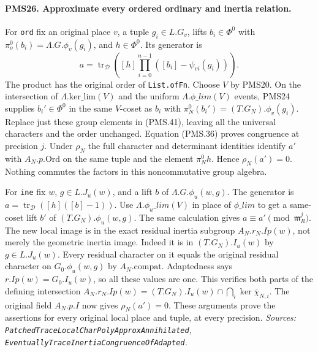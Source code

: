 \paragraph{PMS26. Approximate every ordered ordinary and inertia relation.}
\label{claim:PMS26}
For \texttt{ord} fix an original place $v$, a tuple
$g_i\in L.G_v$, lifts $b_i\in\Phi^0$ with
$\pi_o^0(b_i)=\Lambda.G.\phi_v(g_i)$, and $h\in\Phi^0$.
Its generator is
\[
 a=\operatorname{tr}_{\mathcal D}
 \left([h]\prod_{i=0}^{n-1}
             ([b_i]-\psi_{vi}(g_i))\right).       \tag{PMS.41}
\]
The product has the original order of \texttt{List.ofFn}.
Choose $V$ by PMS20.  On the intersection of
$\Lambda.\mathrm{ker\_lim}(V)$ and the uniform
$\Lambda.\phi\_lim(V)$ events, PMS24 supplies
$b_i'\in\Phi^0$ in the same $V$-coset as $b_i$ with
$\pi_N^0(b_i')=(T.G_N).\phi_v(g_i)$.
Replace just these group elements in (PMS.41), leaving all
the universal characters and the order unchanged.
Equation (PMS.36) proves congruence at precision $j$.
Under $\rho_N$ the full character and determinant identities
identify $a'$ with $A_N.p.\mathrm{Ord}$ on the same tuple and
the element $\pi_N^0h$.  Hence $\rho_N(a')=0$.
Nothing commutes the factors in this noncommutative group algebra.

For \texttt{ine} fix $w$, $g\in L.J_u(w)$, and a lift $b$
of $\Lambda.G.\phi_u(w,g)$.  The generator is
$a=\operatorname{tr}_{\mathcal D}([h]([b]-1))$.
Use $\Lambda.\phi_u\_lim(V)$ in place of $\phi\_lim$ to get
a same-coset lift $b'$ of $(T.G_N).\phi_u(w,g)$.
The same calculation gives $a\equiv a'\pmod{\mathfrak m_R^j}$.
The new local image is in the exact residual inertia subgroup
$A_N.r_N.Ip(w)$, not merely the geometric inertia image.
Indeed it is in $(T.G_N).I_u(w)$ by $g\in L.J_u(w)$.
Every residual character on it equals the original residual
character on $G_0.\phi_u(w,g)$ by $A_N.\mathrm{compat}$.
Adaptedness says $r.Ip(w)=G_0.I_u(w)$, so all these values
are one.  This verifies both parts of the defining intersection
$A_N.r_N.Ip(w)=(T.G_N).I_u(w)\cap\bigcap_i\ker\bar\chi_{N,i}$.
The original field $A_N.p.I$ now gives $\rho_N(a')=0$.
These arguments prove the assertions for every original local
place and tuple, at every precision.
\hfill\textit{Sources: \texttt{PatchedTraceLocalCharPolyApproxAnnihilated},
\texttt{EventuallyTraceInertiaCongruenceOfAdapted}.}

